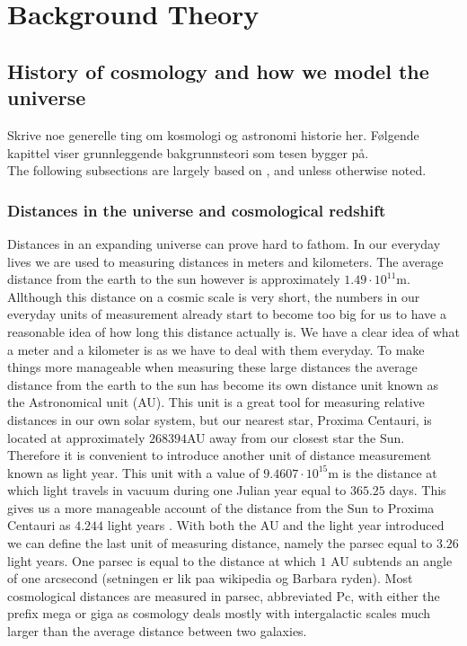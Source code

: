 \chapter{Background Theory}\label{sec:backgroundtheory}
\section{History of cosmology and how we model the universe}
Skrive noe generelle ting om kosmologi og astronomi historie her.
Følgende kapittel viser grunnleggende bakgrunnsteori som tesen bygger på.\\

The following subsections are largely based on \cite[ch.7]{schneider2006extragalactic}, \cite[ch.2]{Dodelson:1282338} and \cite{ryden2017introduction} unless otherwise noted.
\subsection{Distances in the universe and cosmological redshift}\label{sec:sec_distance}
Distances in an expanding universe can prove hard to fathom. In our everyday
lives we are used to measuring distances in meters and kilometers. The
average distance from the earth to the sun however is approximately $1.49\cdot10^{11}$m.
Allthough this distance on a cosmic scale is very short, the numbers in our
everyday units of measurement already start to become too big for us to have a
reasonable idea of how long this distance actually is. We have a clear idea of
what a meter and a kilometer is as we have to deal with them everyday. To make
things more manageable when measuring these large distances the average distance
from the earth to the sun has become its own distance unit known as the
Astronomical unit (AU). This unit is a great tool for measuring relative
distances in our own solar system, but our nearest star, Proxima Centauri, is
located at approximately $268394$AU away from our closest star the Sun.
Therefore it is convenient to introduce another unit of distance measurement known as light year. This unit with a value of $9.4607\cdot10^{15}$m is the distance at
which light travels in vacuum during one Julian year equal to $365.25$ days.
This gives us a more manageable account of the distance from the Sun to Proxima
Centauri as $4.244$ light years \cite{Brown2020GaiaED}. With both the AU and the light year introduced
we can define the last unit of measuring distance, namely the parsec equal to $3.26$
light years. One parsec is equal to the distance at which $1$ AU subtends an angle
of one arcsecond (setningen er lik paa wikipedia og Barbara ryden). Most
cosmological distances are measured in parsec, abbreviated Pc, with either the
prefix mega or giga as cosmology deals mostly with intergalactic scales much
larger than the average distance between two galaxies.\\

